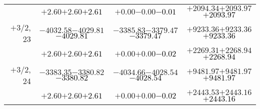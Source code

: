 \documentclass[compress]{beamer}
\begin{document}
\begin{frame}
{\begin{tabular}{r | c | c | c}
           & $+2.60$\hspace{0.1 cm}$+2.60$\hspace{0.1 cm}\textcolor{black}{$+2.61$} & $+0.00$\hspace{0.1 cm}$-0.00$\hspace{0.1 cm}\textcolor{black}{$-0.01$} & $+2094.34$\hspace{0.1 cm}$+2093.97$\hspace{0.1 cm}\textcolor{black}{$+2093.97$} \\
$+$3/2, 23 & $-4032.58$\hspace{0.1 cm}$-4029.81$\hspace{0.1 cm}\textcolor{black}{$-4029.81$} & $-3385.83$\hspace{0.1 cm}$-3379.47$\hspace{0.1 cm}\textcolor{black}{$-3379.47$} & $+9233.36$\hspace{0.1 cm}$+9233.36$\hspace{0.1 cm}\textcolor{black}{$+9233.36$} \\
           & $+2.60$\hspace{0.1 cm}$+2.60$\hspace{0.1 cm}\textcolor{black}{$+2.61$} & $+0.00$\hspace{0.1 cm}$+0.00$\hspace{0.1 cm}\textcolor{black}{$-0.02$} & $+2269.31$\hspace{0.1 cm}$+2268.94$\hspace{0.1 cm}\textcolor{black}{$+2268.94$} \\
$+$3/2, 24 & $-3383.35$\hspace{0.1 cm}$-3380.82$\hspace{0.1 cm}\textcolor{black}{$-3380.82$} & $-4034.66$\hspace{0.1 cm}$-4028.54$\hspace{0.1 cm}\textcolor{black}{$-4028.54$} & $+9481.97$\hspace{0.1 cm}$+9481.97$\hspace{0.1 cm}\textcolor{black}{$+9481.97$} \\
           & $+2.60$\hspace{0.1 cm}$+2.60$\hspace{0.1 cm}\textcolor{black}{$+2.61$} & $+0.00$\hspace{0.1 cm}$+0.00$\hspace{0.1 cm}\textcolor{black}{$-0.02$} & $+2443.53$\hspace{0.1 cm}$+2443.16$\hspace{0.1 cm}\textcolor{black}{$+2443.16$} \\
\end{tabular}}
\end{frame}
\end{document}
